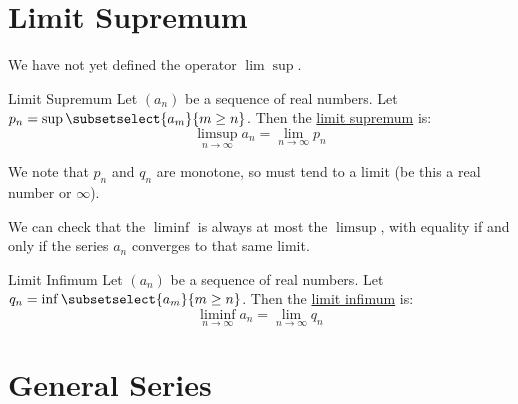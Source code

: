 \documentclass[../Main.tex]{subfiles}
\begin{document}
\section{Limit Supremum}
We have not yet defined the operator $\lim \sup$.
\begin{definition}{Limit Supremum}
    Let $(a_n)$ be a sequence of real numbers. Let $p_n = \sup\subsetselect{a_m}{m \geq n}$. Then the \underline{limit supremum} is:
    \begin{equation*}
        \limsup_{n \to \infty} a_n = \lim_{n \to \infty} p_n
    \end{equation*}
\end{definition}
We note that $p_n$ and $q_n$ are monotone, so must tend to a limit (be this a real number or $\infty$).

We can check that the $\liminf$ is always at most the $\limsup$, with equality if and only if the series $a_n$ converges to that same limit.
\begin{definition}{Limit Infimum}
    Let $(a_n)$ be a sequence of real numbers. Let $q_n = \inf\subsetselect{a_m}{m \geq n}$. Then the \underline{limit infimum} is:
    \begin{equation*}
        \liminf_{n \to \infty} a_n = \lim_{n \to \infty} q_n
    \end{equation*}
\end{definition}
\section{General Series}
\end{document}
